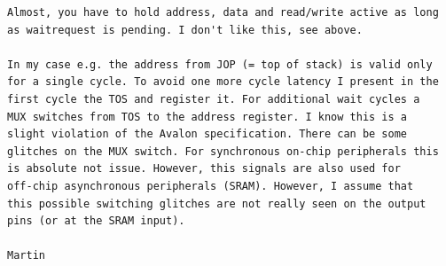 \documentclass[a4paper,12pt]{scrartcl}
\begin{document}
\begin{verbatim}
Almost, you have to hold address, data and read/write active as long
as waitrequest is pending. I don't like this, see above.

In my case e.g. the address from JOP (= top of stack) is valid only
for a single cycle. To avoid one more cycle latency I present in the
first cycle the TOS and register it. For additional wait cycles a
MUX switches from TOS to the address register. I know this is a
slight violation of the Avalon specification. There can be some
glitches on the MUX switch. For synchronous on-chip peripherals this
is absolute not issue. However, this signals are also used for
off-chip asynchronous peripherals (SRAM). However, I assume that
this possible switching glitches are not really seen on the output
pins (or at the SRAM input).

Martin


\end{verbatim}
\end{document}
